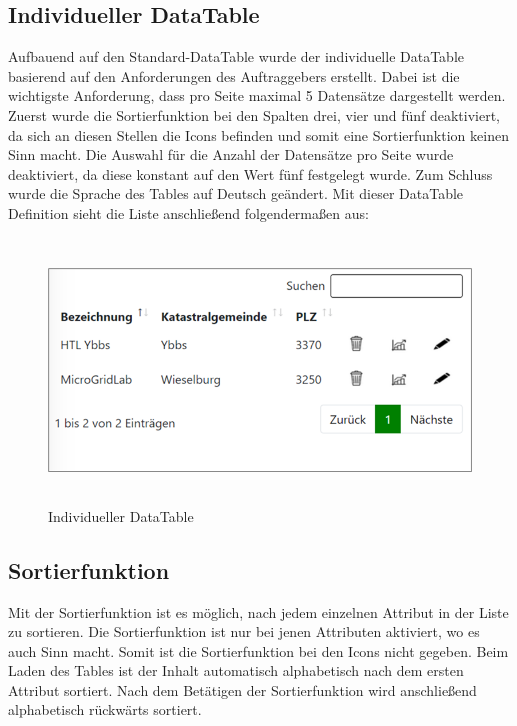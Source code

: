 \subsection{Individueller DataTable}
Aufbauend auf den Standard-DataTable wurde der individuelle DataTable basierend auf den Anforderungen des Auftraggebers erstellt. Dabei ist die wichtigste Anforderung, dass pro Seite maximal 5 Datensätze dargestellt werden.
Zuerst wurde die Sortierfunktion bei den Spalten drei, vier und fünf deaktiviert, da sich an diesen Stellen die Icons befinden und somit eine Sortierfunktion keinen Sinn macht. Die Auswahl für die Anzahl der Datensätze pro Seite wurde deaktiviert, da diese konstant auf den Wert fünf festgelegt wurde. Zum Schluss wurde die Sprache des Tables auf Deutsch geändert.
Mit dieser DataTable Definition sieht die Liste anschließend folgendermaßen aus:
\newline
\begin{figure}[h]
	\centering
	\includegraphics[height=7cm,width=14cm]{images/DataTableIndividuell}
	\caption{Individueller DataTable}
	\label{fig:Energiesystem auswählen }
\end{figure}




\subsection{Sortierfunktion}
Mit der Sortierfunktion ist es möglich, nach jedem einzelnen Attribut in der Liste zu sortieren. Die Sortierfunktion ist nur bei jenen Attributen aktiviert, wo es auch Sinn macht. Somit ist die Sortierfunktion bei den Icons nicht gegeben. Beim Laden des Tables ist der Inhalt automatisch alphabetisch nach dem ersten Attribut sortiert. Nach dem Betätigen der Sortierfunktion wird anschließend alphabetisch rückwärts sortiert.  


